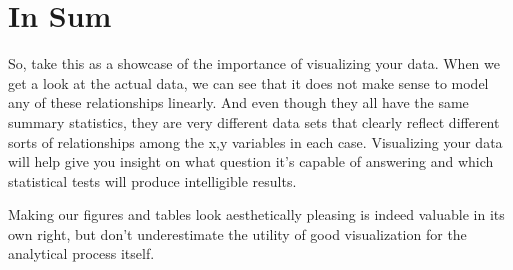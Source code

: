 \documentclass[
  letterpaper,
  DIV=11,
  numbers=noendperiod]{scrreprt}
\begin{document}
\section*{In Sum}\label{in-sum}


So, take this as a showcase of the importance of visualizing your data.
When we get a look at the actual data, we can see that it does not make
sense to model any of these relationships linearly. And even though they
all have the same summary statistics, they are very different data sets
that clearly reflect different sorts of relationships among the x,y
variables in each case. Visualizing your data will help give you insight
on what question it's capable of answering and which statistical tests
will produce intelligible results.

Making our figures and tables look aesthetically pleasing is indeed
valuable in its own right, but don't underestimate the utility of good
visualization for the analytical process itself.
\end{document}

